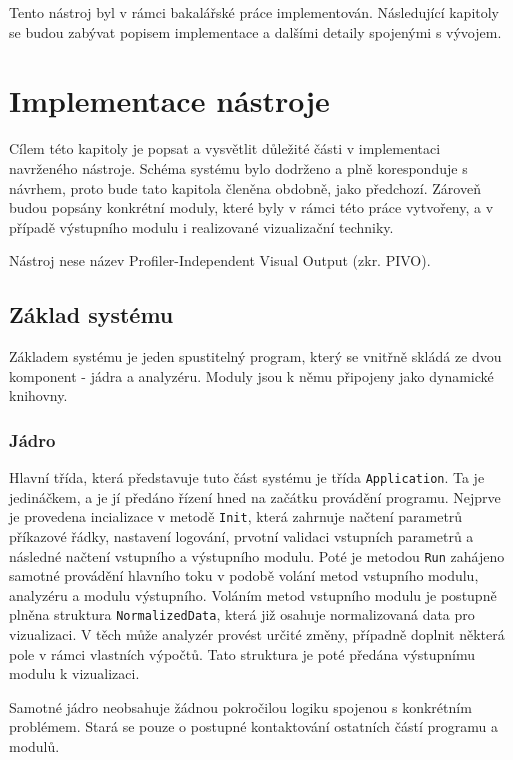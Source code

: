 \documentclass[czech,BP]{thesiskiv}
\begin{document}
Tento nástroj byl v rámci bakalářské práce implementován. Následující kapitoly se budou zabývat popisem implementace a dalšími detaily spojenými s vývojem.


\newpage

\chapter{Implementace nástroje}

Cílem této kapitoly je popsat a vysvětlit důležité části v implementaci navrženého nástroje. Schéma systému bylo dodrženo a plně koresponduje s návrhem, proto bude tato kapitola členěna obdobně, jako předchozí. Zároveň budou popsány konkrétní moduly, které byly v rámci této práce vytvořeny, a v případě výstupního modulu i realizované vizualizační techniky.

Nástroj nese název Profiler-Independent Visual Output (zkr. PIVO).

\section{Základ systému}

Základem systému je jeden spustitelný program, který se vnitřně skládá ze dvou komponent - jádra a analyzéru. Moduly jsou k němu připojeny jako dynamické knihovny.

\subsection{Jádro}

Hlavní třída, která představuje tuto část systému je třída \texttt{Application}. Ta je jedináčkem, a je jí předáno řízení hned na začátku provádění programu. Nejprve je provedena incializace v metodě \texttt{Init}, která zahrnuje načtení parametrů příkazové řádky, nastavení logování, prvotní validaci vstupních parametrů a následné načtení vstupního a výstupního modulu. Poté je metodou \texttt{Run} zahájeno samotné provádění hlavního toku v podobě volání metod vstupního modulu, analyzéru a modulu výstupního. Voláním metod vstupního modulu je postupně plněna struktura \texttt{NormalizedData}, která již osahuje normalizovaná data pro vizualizaci. V těch může analyzér provést určité změny, případně doplnit některá pole v rámci vlastních výpočtů. Tato struktura je poté předána výstupnímu modulu k vizualizaci.

Samotné jádro neobsahuje žádnou pokročilou logiku spojenou s konkrétním problémem. Stará se pouze o postupné kontaktování ostatních částí programu a modulů. 
\end{document}
